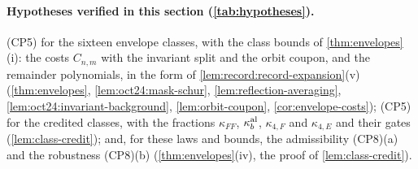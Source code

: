 \paragraph{Hypotheses verified in this section (\cref{tab:hypotheses}).}
(CP5) for the sixteen envelope classes, with the class bounds of
\cref{thm:envelopes}(i): the costs $C_{n,m}$ with the invariant split and the orbit
coupon, and the remainder polynomials, in the form of
\cref{lem:record:record-expansion}(v) (\cref{thm:envelopes}, \cref{lem:oct24:mask-schur},
\cref{lem:reflection-averaging}, \cref{lem:oct24:invariant-background},
\cref{lem:orbit-coupon}, \cref{cor:envelope-costs}); (CP5) for the credited classes, with
the fractions $\kappa_{FF}$, $\kappa^{\rm al}_b$, $\kappa_{4,F}$ and $\kappa_{4,E}$ and their gates
(\cref{lem:class-credit}); and, for these laws and bounds, the admissibility (CP8)(a)
and the robustness (CP8)(b) (\cref{thm:envelopes}(iv), the proof of
\cref{lem:class-credit}).
